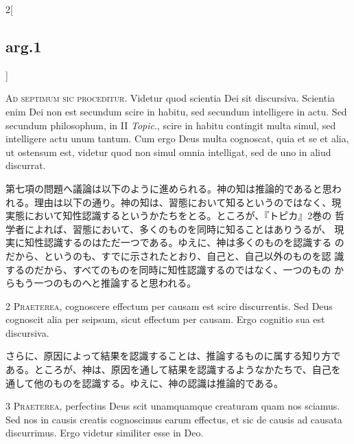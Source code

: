 \documentclass[paper=a4paper,fontsize=10pt,jafontsize=9pt,titlepage]{jlreq}
\begin{document}
\begin{paracol}{2}[\subsection{arg.1}]

{\huge A}{\scshape d septimum sic proceditur}. Videtur quod scientia
Dei sit discursiva. Scientia enim Dei non est secundum scire in
habitu, sed secundum intelligere in actu. Sed secundum philosophum, in
II {\itshape Topic}., scire in habitu contingit multa simul, sed
intelligere actu unum tantum. Cum ergo Deus multa cognoscat, quia et
se et alia, ut ostensum est, videtur quod non simul omnia intelligat,
sed de uno in aliud discurrat.

\switchcolumn

第七項の問題へ議論は以下のように進められる。神の知は推論的であると思わ
れる。理由は以下の通り。神の知は、習態において知るというのではなく、現
実態において知性認識するというかたちをとる。ところが、『トピカ』2巻の
哲学者によれば、習態において、多くのものを同時に知ることはありうるが、
現実に知性認識するのはただ一つである。ゆえに、神は多くのものを認識する
のだから、というのも、すでに示されたとおり、自己と、自己以外のものを認
識するのだから、すべてのものを同時に知性認識するのではなく、一つのもの
からもう一つのものへと推論すると思われる。


{\scshape 2 Praeterea}, cognoscere effectum per causam est scire
discurrentis. Sed Deus cognoscit alia per seipsum, sicut effectum per
causam. Ergo cognitio sua est discursiva.

\switchcolumn

さらに、原因によって結果を認識することは、推論するものに属する知り方で
ある。ところが、神は、原因を通して結果を認識するようなかたちで、自己を
通して他のものを認識する。ゆえに、神の認識は推論的である。


{\scshape 3 Praeterea}, perfectius Deus scit unamquamque creaturam
quam nos sciamus. Sed nos in causis creatis cognoscimus earum
effectus, et sic de causis ad causata discurrimus. Ergo videtur
similiter esse in Deo.


\end{paracol}
\end{document}
